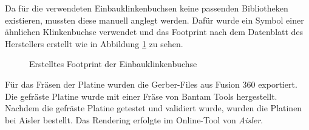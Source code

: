Da für die verwendeten Einbauklinkenbuchsen keine passenden Bibliotheken existieren, mussten diese manuell anglegt werden.
Dafür wurde ein Symbol einer ähnlichen Klinkenbuchse verwendet und das Footprint nach dem Datenblatt des Herstellers erstellt wie in Abbildung \ref{fig:Klinkenbuchse Footprint} zu sehen.

\begin{figure}[h]
	\centering
	\setlength{\fboxsep}{1pt} %
	\setlength{\fboxrule}{1pt} %
	\caption{Erstelltes Footprint der Einbauklinkenbuchse}
	\label{fig:Klinkenbuchse Footprint}
\end{figure}


Für das Fräsen der Platine wurden die Gerber-Files aus Fusion 360 exportiert.
Die gefräste Platine wurde mit einer Fräse von Bantam Tools hergestellt.
Nachdem die gefräste Platine getestet und validiert wurde, wurden die Platinen bei Aisler bestellt. 
Das Rendering erfolgte im Online-Tool von \textit{Aisler}.

